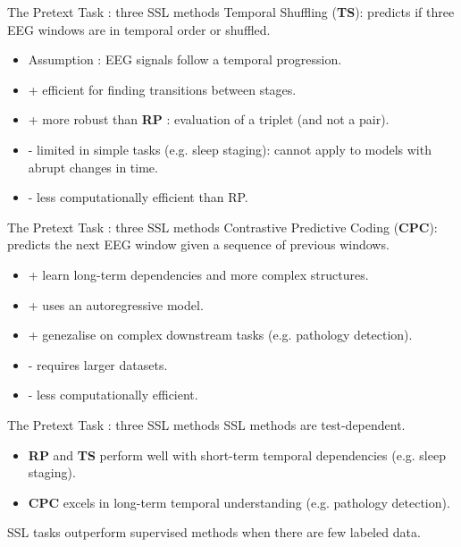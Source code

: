 \begin{frame}{The Pretext Task : three SSL methods}
Temporal Shuffling (\textbf{TS}): predicts if three EEG windows are in temporal order or shuffled.
\begin{itemize}
    \item Assumption : EEG signals follow a temporal progression.
    \item + efficient for finding transitions between stages.
    \item + more robust than \textbf{RP} : evaluation of a triplet (and not a pair).
    \item - limited in simple tasks (e.g. sleep staging): cannot apply to models with abrupt changes in time.
    \item - less computationally efficient than RP.
\end{itemize}
\end{frame}

\begin{frame}{The Pretext Task : three SSL methods}
Contrastive Predictive Coding (\textbf{CPC}): predicts the next EEG window given a sequence of previous windows.
\begin{itemize}
    \item + learn long-term dependencies and more complex structures.
    \item + uses an autoregressive model.
    \item + genezalise on complex downstream tasks (e.g. pathology detection).
    \item - requires larger datasets.
    \item - less computationally efficient.
\end{itemize}
\end{frame}

\begin{frame}{The Pretext Task : three SSL methods}
SSL methods are test-dependent.
\begin{itemize}
    \item \textbf{RP} and \textbf{TS} perform well with short-term temporal dependencies (e.g. sleep staging).
    \item \textbf{CPC} excels in long-term temporal understanding (e.g. pathology detection).
\end{itemize}

SSL tasks outperform supervised methods when there are few labeled data.
\end{frame}

